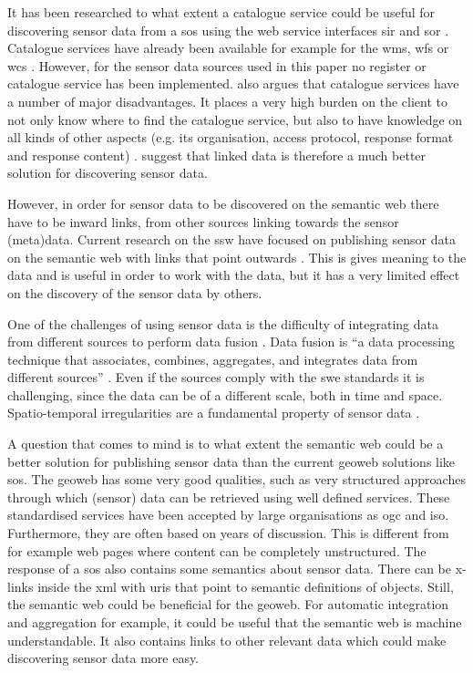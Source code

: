 It has been researched to what extent a catalogue service could be useful for discovering sensor data from a \ac{sos} using the web service interfaces \ac{sir} \citep{SW:OGC3} and \ac{sor} \citep{SW:OGC4}. Catalogue services have already been available for example for the \ac{wms}, \ac{wfs} or \ac{wcs} \citep{SDI:OGC2}. However, for the sensor data sources used in this paper no register or catalogue service has been implemented. \cite{SSW:Atkinson} also argues that catalogue services have a number of major disadvantages. It places a very high burden on the client to not only know where to find the catalogue service, but also to have knowledge on all kinds of other aspects (e.g. its organisation, access protocol, response format and response content) \cite[p. 128]{SSW:Atkinson}. \citeauthor{SSW:Atkinson} suggest that linked data is therefore a much better solution for discovering sensor data. 

However, in order for sensor data to be discovered on the semantic web there have to be inward links, from other sources linking towards the sensor (meta)data. Current research on the \ac{ssw} have focused on publishing sensor data on the semantic web with links that point outwards \citep{SSW:Atkinson, SSW:Janowicz, SSW:Pschorr}. This is gives meaning to the data and is useful in order to work with the data, but it has a very limited effect on the discovery of the sensor data by others. 

One of the challenges of using sensor data is the difficulty of integrating data from different sources to perform data fusion \citep{SSW:Corcho, SSW:Ji, SSW:Wang}. Data fusion is \enquote{a data processing technique that associates, combines, aggregates, and integrates data from different sources} \cite[p. 2]{SSW:Wang2}. Even if the sources comply with the \ac{swe} standards it is challenging, since the data can be of a different scale, both in time and space. Spatio-temporal irregularities are a fundamental property of sensor data \citep{SW:Ganesan}. 

A question that comes to mind is to what extent the semantic web could be a better solution for publishing sensor data than the current geoweb solutions like \ac{sos}. The geoweb has some very good qualities, such as very structured approaches through which (sensor) data can be retrieved using well defined services. These standardised services have been accepted by large organisations as \ac{ogc} and \ac{iso}. Furthermore, they are often based on years of discussion. This is different from for example web pages where content can be completely unstructured. The response of a \ac{sos} also contains some semantics about sensor data. There can be x-links inside the \ac{xml} with \ac{uri}s that point to semantic definitions of objects. Still, the semantic web could be beneficial for the geoweb. For automatic integration and aggregation for example, it could be useful that the semantic web is machine understandable. It also contains links to other relevant data which could make discovering sensor data more easy. 

